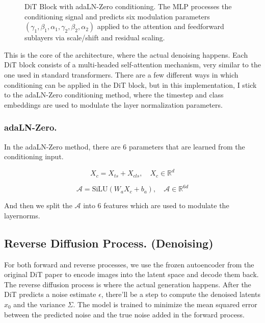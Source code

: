 \documentclass[10pt]{article}
\theoremstyle{plain}
\newcommand{\R}{\mathbb{R}}
\begin{document}
\begin{figure}
{
}
\caption{DiT Block with adaLN-Zero conditioning. The MLP processes the conditioning signal and predicts six modulation parameters $(\gamma_1,\beta_1,\alpha_1,\gamma_2,\beta_2,\alpha_2)$ applied to the attention and feedforward sublayers via scale/shift and residual scaling.}
\label{fig:dit_block}
\end{figure}


This is the core of the architecture, where the actual denoising happens. Each DiT block consists of a multi-headed self-attention mechanism, very similar to the one used in standard transformers. There are a few different ways in which conditioning can be applied in the DiT block, but in this implementation, I stick to the adaLN-Zero conditioning method, where the timestep and class embeddings are used to modulate the layer normalization parameters.

\subsubsection{adaLN-Zero.}

In the adaLN-Zero method, there are 6 parameters that are learned from the conditioning input. 

\[
    X_c = X_{ts} + X_{cls}, \quad X_c \in \R^{d}
\]

\[
    \mathcal{A} = \text{SiLU}(W_a X_c + b_a), \quad \mathcal{A} \in \R^{6d}
\]

And then we split the \(\mathcal{A} \) into 6 features which are used to modulate the layernorms. 

\WFclear
\newpage

\subsection{Reverse Diffusion Process. (Denoising)}

For both forward and reverse processes, we use the frozen autoencoder from the original DiT paper to encode images into the latent space and decode them back. The reverse diffusion process is where the actual generation happens. After the DiT predicts a noise estimate \(\hat{\epsilon}\), there'll be a step to compute the denoised latents \(\hat{x}_0\) and the variance \(\Sigma\). The model is trained to minimize the mean squared error between the predicted noise and the true noise added in the forward process.
\end{document}
